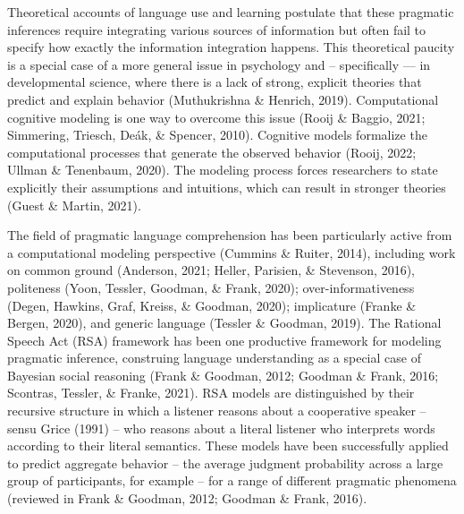 \documentclass[
  man,floatsintext]{apa6}
\begin{document}
Theoretical accounts of language use and learning postulate that these pragmatic inferences require integrating various sources of information but often fail to specify how exactly the information integration happens. This theoretical paucity is a special case of a more general issue in psychology and -- specifically --- in developmental science, where there is a lack of strong, explicit theories that predict and explain behavior (Muthukrishna \& Henrich, 2019). Computational cognitive modeling is one way to overcome this issue (Rooij \& Baggio, 2021; Simmering, Triesch, Deák, \& Spencer, 2010). Cognitive models formalize the computational processes that generate the observed behavior (Rooij, 2022; Ullman \& Tenenbaum, 2020). The modeling process forces researchers to state explicitly their assumptions and intuitions, which can result in stronger theories (Guest \& Martin, 2021).

The field of pragmatic language comprehension has been particularly active from a computational modeling perspective (Cummins \& Ruiter, 2014), including work on common ground (Anderson, 2021; Heller, Parisien, \& Stevenson, 2016), politeness (Yoon, Tessler, Goodman, \& Frank, 2020); over-informativeness (Degen, Hawkins, Graf, Kreiss, \& Goodman, 2020); implicature (Franke \& Bergen, 2020), and generic language (Tessler \& Goodman, 2019). The Rational Speech Act (RSA) framework has been one productive framework for modeling pragmatic inference, construing language understanding as a special case of Bayesian social reasoning (Frank \& Goodman, 2012; Goodman \& Frank, 2016; Scontras, Tessler, \& Franke, 2021). RSA models are distinguished by their recursive structure in which a listener reasons about a cooperative speaker -- sensu Grice (1991) -- who reasons about a literal listener who interprets words according to their literal semantics. These models have been successfully applied to predict aggregate behavior -- the average judgment probability across a large group of participants, for example -- for a range of different pragmatic phenomena (reviewed in Frank \& Goodman, 2012; Goodman \& Frank, 2016).
\end{document}
